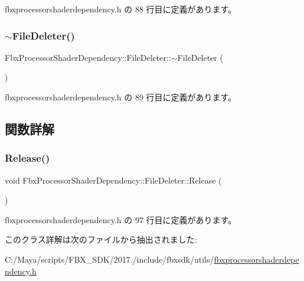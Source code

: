  fbxprocessorshaderdependency.\+h の 88 行目に定義があります。

\mbox{\label{class_fbx_processor_shader_dependency_1_1_file_deleter_a16ff5637056bea8b0b96234f874fcba5}} 
\subsubsection{\texorpdfstring{$\sim$\+File\+Deleter()}{~FileDeleter()}}
{\footnotesize\ttfamily Fbx\+Processor\+Shader\+Dependency\+::\+File\+Deleter\+::$\sim$\+File\+Deleter (\begin{DoxyParamCaption}{ }\end{DoxyParamCaption})\hspace{0.3cm}{\ttfamily [inline]}}



 fbxprocessorshaderdependency.\+h の 89 行目に定義があります。



\subsection{関数詳解}
\mbox{\label{class_fbx_processor_shader_dependency_1_1_file_deleter_a23e8e0bc187b5625de18a905c2c2b75c}} 
\subsubsection{\texorpdfstring{Release()}{Release()}}
{\footnotesize\ttfamily void Fbx\+Processor\+Shader\+Dependency\+::\+File\+Deleter\+::\+Release (\begin{DoxyParamCaption}{ }\end{DoxyParamCaption})\hspace{0.3cm}{\ttfamily [inline]}}



 fbxprocessorshaderdependency.\+h の 97 行目に定義があります。



このクラス詳解は次のファイルから抽出されました\+:\begin{DoxyCompactItemize}
\item 
C\+:/\+Maya/scripts/\+F\+B\+X\+\_\+\+S\+D\+K/2017./include/fbxsdk/utils/\hyperlink{fbxprocessorshaderdependency_8h}{fbxprocessorshaderdependency.\+h}\end{DoxyCompactItemize}
